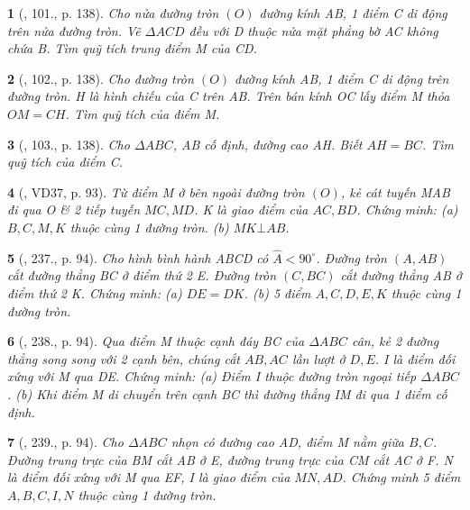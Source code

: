 \documentclass{article}
\newtheorem{baitoan}{}
\begin{document}
\begin{baitoan}[\cite{Tuyen_Toan_9_old}, 101., p. 138]
	Cho nửa đường tròn $(O)$ đường kính AB, 1 điểm C di động trên nửa đường tròn. Vẽ $\Delta ACD$ đều với D thuộc nửa mặt phẳng bờ AC không chứa B. Tìm quỹ tích trung điểm M của CD.
\end{baitoan}

\begin{baitoan}[\cite{Tuyen_Toan_9_old}, 102., p. 138]
	Cho đường tròn $(O)$ đường kính AB, 1 điểm C di động trên đường tròn. H là hình chiếu của C trên AB. Trên bán kính OC lấy điểm M thỏa $OM = CH$. Tìm quỹ tích của điểm M.
\end{baitoan}

\begin{baitoan}[\cite{Tuyen_Toan_9_old}, 103., p. 138]
	Cho $\Delta ABC$, AB cố định, đường cao AH. Biết $AH = BC$. Tìm quỹ tích của điểm C.
\end{baitoan}

\begin{baitoan}[\cite{Binh_Toan_9_tap_2}, VD37, p. 93]
	Từ điểm M ở bên ngoài đường tròn $(O)$, kẻ cát tuyến MAB đi qua O \& 2 tiếp tuyến $MC,MD$. K là giao điểm của $AC,BD$. Chứng minh: (a) $B,C,M,K$ thuộc cùng 1 đường tròn. (b) $MK\bot AB$.
\end{baitoan}

\begin{baitoan}[\cite{Binh_Toan_9_tap_2}, 237., p. 94]
	Cho hình bình hành ABCD có $\widehat{A} < 90^\circ$. Đường tròn $(A,AB)$ cắt đường thẳng BC ở điểm thứ 2 E. Đường tròn $(C,BC)$ cắt đường thẳng AB ở điểm thứ 2 K. Chứng minh: (a) $DE = DK$. (b) 5 điểm $A,C,D,E,K$ thuộc cùng 1 đường tròn.
\end{baitoan}

\begin{baitoan}[\cite{Binh_Toan_9_tap_2}, 238., p. 94]
	Qua điểm M thuộc cạnh đáy BC của $\Delta ABC$ cân, kẻ 2 đường thẳng song song với 2 cạnh bên, chúng cắt $AB,AC$ lần lượt ở $D,E$. I là điểm đối xứng với M qua DE. Chứng minh: (a) Điểm I thuộc đường tròn ngoại tiếp $\Delta ABC$. (b) Khi điểm M di chuyển trên cạnh BC thì đường thẳng IM đi qua 1 điểm cố định.
\end{baitoan}

\begin{baitoan}[\cite{Binh_Toan_9_tap_2}, 239., p. 94]
	Cho $\Delta ABC$ nhọn có đường cao AD, điểm M nằm giữa $B,C$. Đường trung trực của BM cắt AB ở E, đường trung trực của CM cắt AC ở F. N là điểm đối xứng với M qua EF, I là giao điểm của $MN,AD$. Chứng minh 5 điểm $A,B,C,I,N$ thuộc cùng 1 đường tròn.
\end{baitoan}
\end{document}
